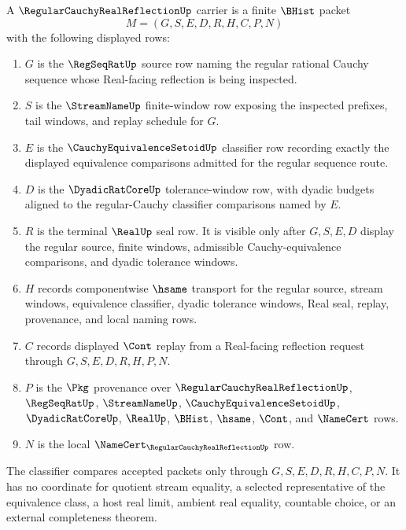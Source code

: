 \begin{definition}
\label{def:regular-cauchy-real-reflection-carrier}
A $\RegularCauchyRealReflectionUp$ carrier is a finite $\BHist$ packet
$$
M=(G,S,E,D,R,H,C,P,N)
$$
with the following displayed rows:
\begin{enumerate}
\item $G$ is the $\RegSeqRatUp$ source row naming the regular rational Cauchy sequence whose Real-facing reflection is being inspected.
\item $S$ is the $\StreamNameUp$ finite-window row exposing the inspected prefixes, tail windows, and replay schedule for $G$.
\item $E$ is the $\CauchyEquivalenceSetoidUp$ classifier row recording exactly the displayed equivalence comparisons admitted for the regular sequence route.
\item $D$ is the $\DyadicRatCoreUp$ tolerance-window row, with dyadic budgets aligned to the regular-Cauchy classifier comparisons named by $E$.
\item $R$ is the terminal $\RealUp$ seal row. It is visible only after $G,S,E,D$ display the regular source, finite windows, admissible Cauchy-equivalence comparisons, and dyadic tolerance windows.
\item $H$ records componentwise $\hsame$ transport for the regular source, stream windows, equivalence classifier, dyadic tolerance windows, Real seal, replay, provenance, and local naming rows.
\item $C$ records displayed $\Cont$ replay from a Real-facing reflection request through $G,S,E,D,R,H,P,N$.
\item $P$ is the $\Pkg$ provenance over $\RegularCauchyRealReflectionUp$, $\RegSeqRatUp$, $\StreamNameUp$, $\CauchyEquivalenceSetoidUp$, $\DyadicRatCoreUp$, $\RealUp$, $\BHist$, $\hsame$, $\Cont$, and $\NameCert$ rows.
\item $N$ is the local $\NameCert_{\RegularCauchyRealReflectionUp}$ row.
\end{enumerate}
The classifier compares accepted packets only through $G,S,E,D,R,H,C,P,N$. It has no coordinate for quotient stream equality, a selected representative of the equivalence class, a host real limit, ambient real equality, countable choice, or an external completeness theorem.
\end{definition}

